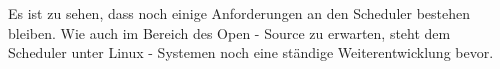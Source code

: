 \documentclass[ngerman]{seminarvorlage}
\begin{document}
Es ist zu sehen, dass noch einige Anforderungen an den Scheduler bestehen bleiben.
Wie auch im Bereich des Open - Source zu erwarten, steht dem Scheduler unter Linux - Systemen noch eine ständige Weiterentwicklung bevor.  


\pagebreak

%
%


\end{document}
